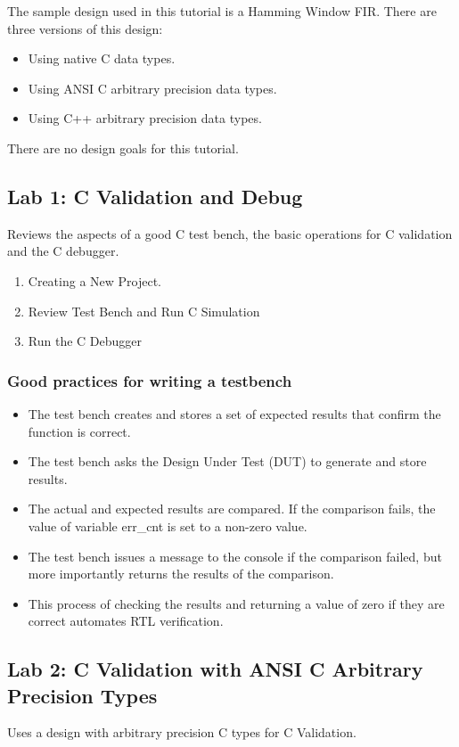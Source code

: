 The sample design used in this tutorial is a Hamming Window FIR. There are three versions
of this design:
\begin{itemize}
    \item Using native C data types.
    \item Using ANSI C arbitrary precision data types.
    \item Using C++ arbitrary precision data types.
\end{itemize}
There are no design goals for this tutorial.


\subsection{Lab 1: C Validation and Debug}
Reviews the aspects of a good C test bench, the basic operations for C validation and the C debugger.

\begin{enumerate}[label=Step \arabic*:]
    \item Creating a New Project.    
    \item Review Test Bench and Run C Simulation
    \item Run the C Debugger
\end{enumerate}

\subsubsection{Good practices for writing a testbench}
\begin{itemize}
    \item The test bench creates and stores a set of expected results that confirm the function is correct.
    \item The test bench asks the Design Under Test (DUT) to generate and store results.
    \item The actual and expected results are compared. If the comparison fails, the value of variable err\_cnt is set to a non-zero value.
    \item The test bench issues a message to the console if the comparison failed, but more importantly returns the results of the comparison. 
    \item This process of checking the results and returning a value of zero if they are correct automates RTL verification.
\end{itemize}

\subsection{Lab 2: C Validation with ANSI C Arbitrary Precision Types}
Uses a design with arbitrary precision C types for C Validation.

